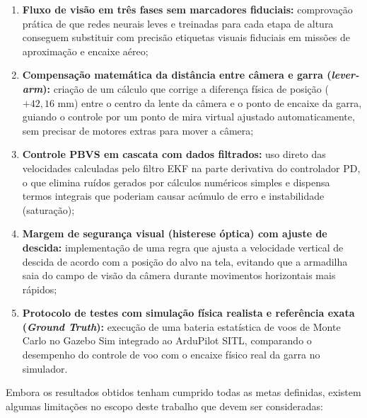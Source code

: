 \begin{enumerate}
	\item \textbf{Fluxo de visão em três fases sem marcadores fiduciais:} comprovação prática de que redes neurais leves e treinadas para cada etapa de altura conseguem substituir com precisão etiquetas visuais fiduciais em missões de aproximação e encaixe aéreo;
	\item \textbf{Compensação matemática da distância entre câmera e garra (\textit{lever-arm}):} criação de um cálculo que corrige a diferença física de posição ($+42{,}16\text{ mm}$) entre o centro da lente da câmera e o ponto de encaixe da garra, guiando o controle por um ponto de mira virtual ajustado automaticamente, sem precisar de motores extras para mover a câmera;
	\item \textbf{Controle PBVS em cascata com dados filtrados:} uso direto das velocidades calculadas pelo filtro EKF na parte derivativa do controlador PD, o que elimina ruídos gerados por cálculos numéricos simples e dispensa termos integrais que poderiam causar acúmulo de erro e instabilidade (saturação);
	\item \textbf{Margem de segurança visual (histerese óptica) com ajuste de descida:} implementação de uma regra que ajusta a velocidade vertical de descida de acordo com a posição do alvo na tela, evitando que a armadilha saia do campo de visão da câmera durante movimentos horizontais mais rápidos;
	\item \textbf{Protocolo de testes com simulação física realista e referência exata (\textit{Ground Truth}):} execução de uma bateria estatística de voos de Monte Carlo no Gazebo Sim integrado ao ArduPilot SITL, comparando o desempenho do controle de voo com o encaixe físico real da garra no simulador.
\end{enumerate}


Embora os resultados obtidos tenham cumprido todas as metas definidas, existem algumas limitações no escopo deste trabalho que devem ser consideradas:

